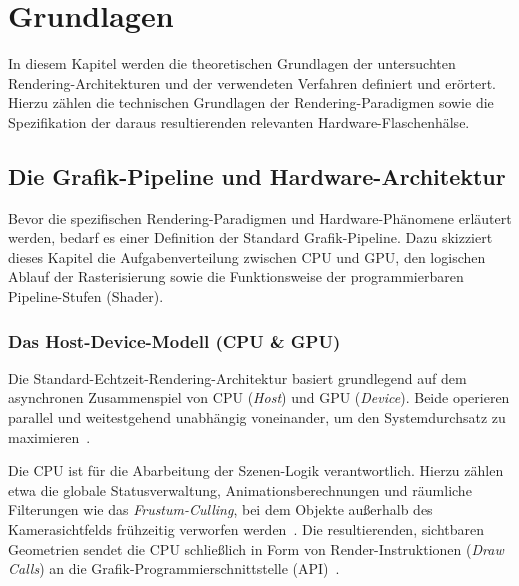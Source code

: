 \chapter{Grundlagen}
\label{ch:02_grundlagen}

In diesem Kapitel werden die theoretischen Grundlagen der untersuchten Rendering-Architekturen und der verwendeten
Verfahren definiert und erörtert.
Hierzu zählen die technischen Grundlagen der Rendering-Paradigmen sowie die Spezifikation der daraus resultierenden
relevanten Hardware-Flaschenhälse.


\section{Die Grafik-Pipeline und Hardware-Architektur}
\label{sec:0201_grafik_pipeline_hardware}

Bevor die spezifischen Rendering-Paradigmen und Hardware-Phänomene erläutert werden, bedarf es einer
Definition der Standard Grafik-Pipeline.
Dazu skizziert dieses Kapitel die Aufgabenverteilung zwischen \ac{CPU} und \ac{GPU}, den logischen Ablauf
der Rasterisierung sowie die Funktionsweise der programmierbaren Pipeline-Stufen (Shader).

\subsection{Das Host-Device-Modell (CPU \& GPU)}
\label{subsec:020101_host_device_modell}

Die Standard-Echtzeit-Rendering-Architektur basiert grundlegend auf dem asynchronen Zusammenspiel von \ac{CPU}
(\textit{Host}) und \ac{GPU} (\textit{Device}).
Beide operieren parallel und weitestgehend unabhängig voneinander, um den Systemdurchsatz zu
maximieren~\parencite[vgl.][Kap.~11.2.1.2 u.~11.2.5.1]{gregoryGameEngineArchitecture2018}.

Die \ac{CPU} ist für die Abarbeitung der Szenen-Logik verantwortlich.
Hierzu zählen etwa die globale Statusverwaltung, Animationsberechnungen und räumliche Filterungen wie das
\textit{Frustum-Culling}, bei dem Objekte außerhalb des Kamerasichtfelds frühzeitig verworfen
werden~\parencites(vgl.)()[Kap.3.1]{akenine-mollerRealtimeRendering2019}
[Kap.~11.2.7.1, Abschn.~\textit{Frustum-Culling}]{gregoryGameEngineArchitecture2018}.
Die resultierenden, sichtbaren Geometrien sendet die \ac{CPU} schließlich in Form von Render-Instruktionen
(\textit{Draw Calls}) an die Grafik-Programmierschnittstelle
(\ac{API})~\parencite[vgl.][Abschn.~\textit{The logical pipeline}]{pixeljetstreamPixelJetStream2015}.

